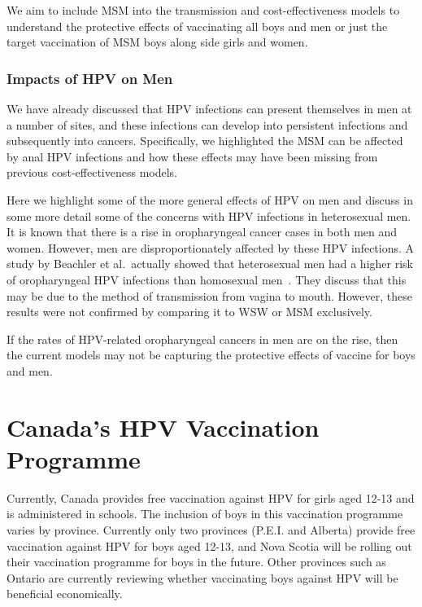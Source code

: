 \documentclass[12pt]{article}
\begin{document}
We aim to include MSM into the transmission and cost-effectiveness models to understand the protective effects of vaccinating all boys and men or just the target vaccination of MSM boys along side girls and women.

\subsubsection*{Impacts of HPV on Men}

We have already discussed that HPV infections can present themselves in men at a number of sites, and these infections can develop into persistent infections and subsequently into cancers.  Specifically, we highlighted the MSM can be affected by anal HPV infections and how these effects may have been missing from previous cost-effectiveness models.  

Here we highlight some of the more general effects of HPV on men and discuss in some more detail some of the concerns with HPV infections in heterosexual men.  It is known that there is a rise in oropharyngeal cancer cases in both men and women.  However, men are disproportionately affected by these HPV infections.  A study by Beachler et al.\ actually showed that heterosexual men had a higher risk of oropharyngeal HPV infections than homosexual men~\cite{Beachler:2013}.  They discuss that this may be due to the method of transmission from vagina to mouth.  However, these results were not confirmed by comparing it to WSW or MSM exclusively.  

If the rates of HPV-related oropharyngeal cancers in men are on the rise, then the current models may not be capturing the protective effects of vaccine for boys and men.  

\section{Canada's HPV Vaccination Programme}

Currently, Canada provides free vaccination against HPV for girls aged 12-13 and is administered in schools.  The inclusion of boys in this vaccination programme varies by province.  Currently only two provinces (P.E.I. and Alberta) provide free vaccination against HPV for boys aged 12-13, and Nova Scotia will be rolling out their vaccination programme for boys in the future.  Other provinces such as Ontario are currently reviewing whether vaccinating boys against HPV will be beneficial economically.
\end{document}
